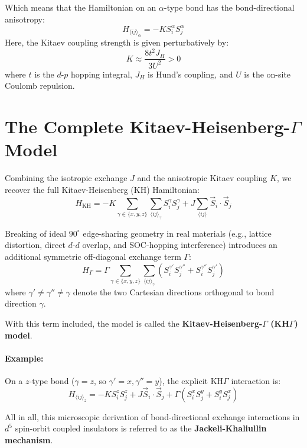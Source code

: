 \documentclass[11pt,a4paper]{article}
\begin{document}
Which means that the Hamiltonian on an $\alpha$-type bond has the bond-directional anisotropy:
\begin{equation}
    H_{\langle ij \rangle_\alpha} = -K S_{i}^{\alpha} S_{j}^{\alpha}
\end{equation}
Here, the Kitaev coupling strength is given perturbatively by:
\begin{equation}
    K \approx \frac{8 t^2 J_H}{3 U^2} > 0
\end{equation}
where $t$ is the $d$-$p$ hopping integral, $J_H$ is Hund's coupling, and $U$ is the on-site Coulomb repulsion.

\section{The Complete Kitaev-Heisenberg-\texorpdfstring{$\Gamma$}{Gamma} Model}

Combining the isotropic exchange $J$ and the anisotropic Kitaev coupling $K$, we recover the full Kitaev-Heisenberg (KH) Hamiltonian:
\begin{equation}
    H_{\text{KH}} = -K \sum_{\gamma \in \{x,y,z\}} \sum_{\langle ij \rangle_\gamma} S_{i}^{\gamma} S_{j}^{\gamma} + J \sum_{\langle ij \rangle} \vec{S}_{i} \cdot \vec{S}_{j}
\end{equation}

Breaking of ideal $90^\circ$ edge-sharing geometry in real materials (e.g., lattice distortion, direct $d$-$d$ overlap, and SOC-hopping interference) introduces an additional symmetric off-diagonal exchange term $\Gamma$:
\begin{equation}
    H_\Gamma = \Gamma \sum_{\gamma \in \{x,y,z\}} \sum_{\langle ij \rangle_\gamma} \left( S_{i}^{\gamma'} S_{j}^{\gamma''} + S_{i}^{\gamma''} S_{j}^{\gamma'} \right)
\end{equation}
where $\gamma' \neq \gamma'' \neq \gamma$ denote the two Cartesian directions orthogonal to bond direction $\gamma$.

With this term included, the model is called the \textbf{Kitaev-Heisenberg-$\Gamma$ (KH$\Gamma$) model}.

\paragraph{Example:}
On a $z$-type bond ($\gamma = z$, so $\gamma' = x, \gamma'' = y$), the explicit KH$\Gamma$ interaction is:
\begin{equation}
    H_{\langle ij \rangle_z} = -K S_i^z S_j^z + J \vec{S}_i \cdot \vec{S}_j + \Gamma \left( S_i^x S_j^y + S_i^y S_j^x \right)
\end{equation}

All in all, this microscopic derivation of bond-directional exchange interactions in $d^5$ spin-orbit coupled insulators is referred to as the \textbf{Jackeli-Khaliullin mechanism}.
\end{document}
